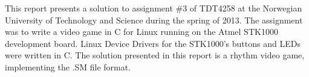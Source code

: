This report presents a solution to assignment \#3 of TDT4258 at the Norwegian University of Technology and Science during the spring of 2013.
The assignment was to write a video game in C for Linux running on the Atmel STK1000 development board.
Linux Device Drivers for the STK1000's buttons and LEDs were written in C.
The solution presented in this report is a rhythm video game, implementing the .SM file format.